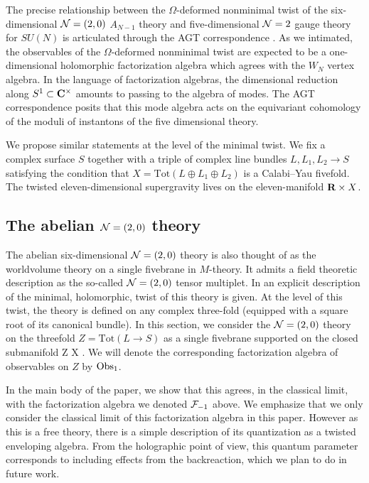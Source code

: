 The precise relationship between the $\Omega$-deformed nonminimal twist of the six-dimensional $\mathcal N=(2,0)$ $A_{N-1}$ theory and five-dimensional $\mathcal N=2$ gauge theory for $SU(N)$ is articulated through the AGT correspondence \cite{AGT}. As we intimated, the observables of the $\Omega$-deformed nonminimal twist are expected to be a one-dimensional holomorphic factorization algebra which agrees with the $W_{N}$ vertex algebra. In the language of factorization algebras, the dimensional reduction along $S^{1}\subset \mathbf{C}^{\times}$ amounts to passing to the algebra of modes. The AGT correspondence posits that this mode algebra acts on the equivariant cohomology of the moduli of instantons of the five dimensional theory.

We propose similar statements at the level of the minimal twist. 
We fix a complex surface $S$ together with a triple of complex line bundles $L, L_1, L_2\to S$ satisfying the condition that $X = \text{Tot} (L \oplus L_1 \oplus L_2)$ is a Calabi--Yau fivefold. 
The twisted eleven-dimensional supergravity lives on the eleven-manifold $\mathbf{R} \times X$. 

\subsection*{The abelian $\mathcal N=(2,0)$ theory}

The abelian six-dimensional $\mathcal N=(2,0)$ theory is also thought of as the worldvolume theory on a single fivebrane in $M$-theory. 
It admits a field theoretic description as the so-called $\mathcal N=(2,0)$ tensor multiplet. 
In \cite{SWtensor} an explicit description of the minimal, holomorphic, twist of this theory is given.
At the level of this twist, the theory is defined on any complex three-fold (equipped with a square root of its canonical bundle). 
In this section, we consider the $\mathcal N=(2,0)$ theory on the threefold $Z = \text{Tot}(L \to S)$ as a single fivebrane supported on the closed submanifold
\beqn
Z \hookrightarrow \R \times X .
\eeqn
We will denote the corresponding factorization algebra of observables on $Z$ by $\operatorname{Obs}_1$.

In the main body of the paper, we show that this agrees, in the classical limit, with the factorization algebra we denoted $\mathcal F_{-1}$ above. 
We emphasize that we only consider the classical limit of this factorization algebra in this paper. 
However as this is a free theory, there is a simple description of its quantization as a twisted enveloping algebra.
From the holographic point of view, this quantum parameter corresponds to including effects from the backreaction, which we plan to do in future work.

